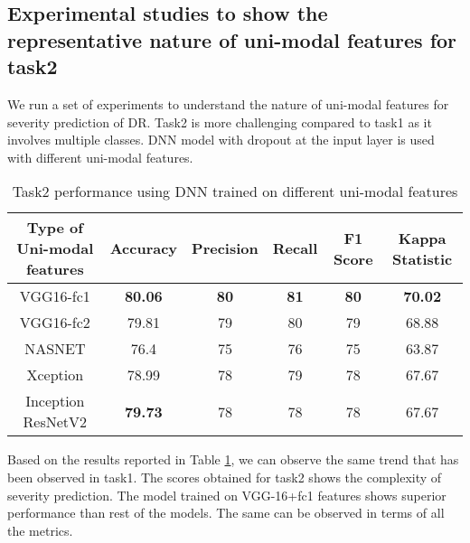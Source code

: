 \documentclass[electronics,article,accept ,moreauthors,pdftex]{mdpi}
\begin{document}
\subsection{Experimental studies to show the representative nature of uni-modal features for task2} We run a set of experiments to understand the nature of uni-modal features for  severity prediction of DR. Task2 is more challenging compared to task1 as it involves multiple  classes. DNN model with dropout at the  input layer is used with different uni-modal features. 
\begin{table}[h!]
    \centering
    \caption{Task2 performance using DNN  trained on different uni-modal features}
    \label{tab:result_multi_vgg16_fc1}
    \begin{tabular}{|c|c|c|c|c|c|}
        \hline
        \textbf{Type of  Uni-modal features} & \textbf{Accuracy} & \textbf{Precision} & \textbf{Recall} & \textbf{F1 Score} & \textbf{Kappa Statistic} \\ \hline
        VGG16-fc1 & \textbf{80.06} & \textbf{80} & \textbf{81} & \textbf{80} & \textbf{70.02} \\
        \hline
        VGG16-fc2  & 79.81 & 79 & 80 & 79 & 68.88 \\ \hline
NASNET & 76.4  & 75 & 76 & 75 & 63.87 \\ \hline
Xception            & 78.99 & 78 & 79 & 78 & 67.67 \\ \hline
Inception ResNetV2  & \textbf{79.73} & 78 & 78 & 78 & 67.67 \\ \hline
    \end{tabular}
\end{table}

Based on the results reported in Table \ref{tab:result_multi_vgg16_fc1}, we can observe the same trend that has been observed in task1. The scores obtained for task2 shows the complexity of severity prediction. The model trained on VGG-16+fc1 features shows superior performance than rest of the models. The same can be observed in terms of all the metrics. 
\end{document}
